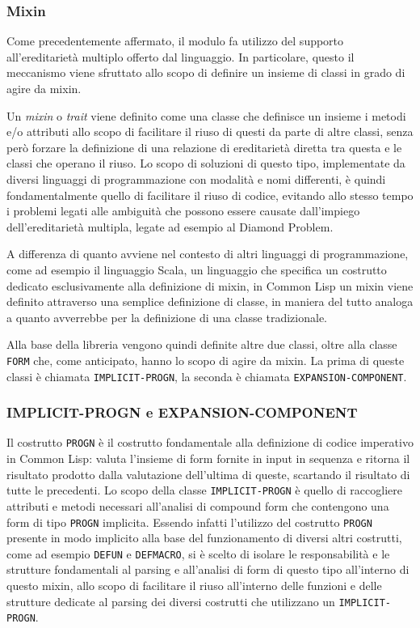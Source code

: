 \subsubsection{Mixin}

Come precedentemente affermato, il modulo fa utilizzo del supporto
all'ereditarietà multiplo offerto dal linguaggio. In particolare, questo il
meccanismo viene sfruttato allo scopo di definire un insieme di classi in grado
di agire da mixin.

Un \textit{mixin} o \textit{trait} viene definito come una classe che definisce
un insieme i metodi e/o attributi allo scopo di facilitare il riuso di questi da
parte di altre classi, senza però forzare la definizione di una relazione di
ereditarietà diretta tra questa e le classi che operano il riuso. Lo scopo di
soluzioni di questo tipo, implementate da diversi linguaggi di programmazione
con modalità e nomi differenti, è quindi fondamentalmente quello di facilitare
il riuso di codice, evitando allo stesso tempo i problemi legati alle ambiguità
che possono essere causate dall’impiego dell’ereditarietà multipla, legate ad
esempio al Diamond Problem\cite{martin1997}.

A differenza di quanto avviene nel contesto di altri linguaggi di
programmazione, come ad esempio il linguaggio Scala, un linguaggio che
specifica un costrutto dedicato esclusivamente alla definizione di mixin, in
Common Lisp un mixin viene definito attraverso una semplice definizione di
classe, in maniera del tutto analoga a quanto avverrebbe per la definizione di
una classe tradizionale.

Alla base della libreria vengono quindi definite altre due classi, oltre alla
classe \texttt{FORM} che, come anticipato, hanno lo scopo di agire da mixin.
La prima di queste classi è chiamata \texttt{IMPLICIT-PROGN}, la seconda è
chiamata \texttt{EXPANSION-COMPONENT}.

\subsubsection{IMPLICIT-PROGN e EXPANSION-COMPONENT}

Il costrutto \texttt{PROGN} è il costrutto fondamentale alla definizione di
codice imperativo in Common Lisp: valuta l’insieme di form fornite in input in
sequenza e ritorna il risultato prodotto dalla valutazione dell’ultima di
queste, scartando il risultato di tutte le precedenti. Lo scopo della classe
\texttt{IMPLICIT-PROGN} è quello di raccogliere attributi e metodi necessari
all’analisi di compound form che contengono una form di tipo \texttt{PROGN}
implicita. Essendo infatti l’utilizzo del costrutto \texttt{PROGN} presente in
modo implicito alla base del funzionamento di diversi altri costrutti, come ad
esempio \texttt{DEFUN} e \texttt{DEFMACRO}, si è scelto di isolare le
responsabilità e le strutture fondamentali al parsing e all’analisi di form di
questo tipo all’interno di questo mixin, allo scopo di facilitare il riuso
all’interno delle funzioni e delle strutture dedicate al parsing dei diversi
costrutti che utilizzano un \texttt{IMPLICIT-PROGN}.

